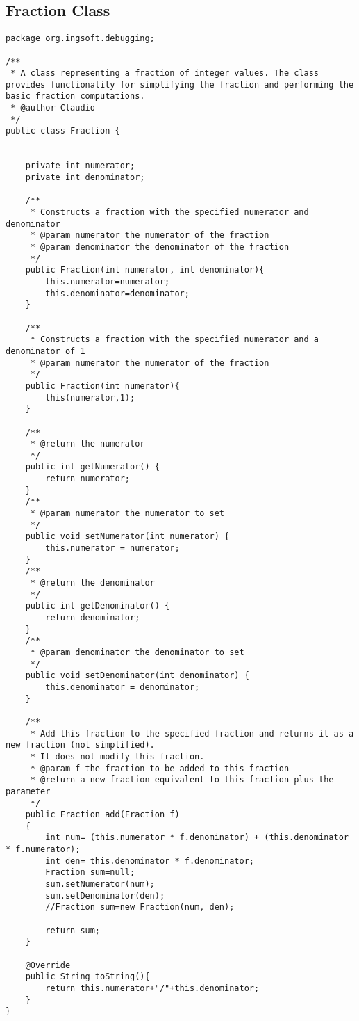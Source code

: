 \documentclass{article}
\begin{document}
\subsection{Fraction Class}
\begin{lstlisting}
package org.ingsoft.debugging;

/**
 * A class representing a fraction of integer values. The class provides functionality for simplifying the fraction and performing the basic fraction computations.
 * @author Claudio
 */
public class Fraction {
	
	
	private int numerator;
	private int denominator;
	
	/**
	 * Constructs a fraction with the specified numerator and denominator
	 * @param numerator the numerator of the fraction
	 * @param denominator the denominator of the fraction
	 */
	public Fraction(int numerator, int denominator){
		this.numerator=numerator;
		this.denominator=denominator;
	}
	
	/**
	 * Constructs a fraction with the specified numerator and a denominator of 1
	 * @param numerator the numerator of the fraction
	 */
	public Fraction(int numerator){
		this(numerator,1);
	}
	
	/**
	 * @return the numerator
	 */
	public int getNumerator() {
		return numerator;
	}
	/**
	 * @param numerator the numerator to set
	 */
	public void setNumerator(int numerator) {
		this.numerator = numerator;
	}
	/**
	 * @return the denominator
	 */
	public int getDenominator() {
		return denominator;
	}
	/**
	 * @param denominator the denominator to set
	 */
	public void setDenominator(int denominator) {
		this.denominator = denominator;
	}

	/**
	 * Add this fraction to the specified fraction and returns it as a new fraction (not simplified). 
	 * It does not modify this fraction.
	 * @param f the fraction to be added to this fraction
	 * @return a new fraction equivalent to this fraction plus the parameter
	 */
	public Fraction add(Fraction f)
	{
		int num= (this.numerator * f.denominator) + (this.denominator * f.numerator);
		int den= this.denominator * f.denominator;
		Fraction sum=null;
		sum.setNumerator(num);
		sum.setDenominator(den);
		//Fraction sum=new Fraction(num, den);		
		
		return sum;
	}
	
	@Override
	public String toString(){
		return this.numerator+"/"+this.denominator;
	}
}
\end{lstlisting}
\end{document}
